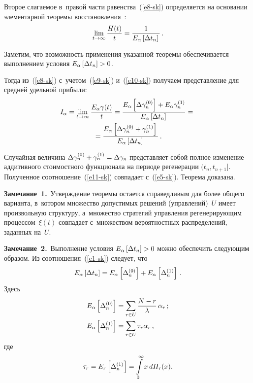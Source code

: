 \begin{multicols}{2}
  Второе слагаемое в~правой час\-ти равенства~(\ref{e8-sk}) определяется на 
основании элементарной тео\-ре\-мы восстановления~\cite{9-sk}:
  \begin{equation}
  \lim\limits_{t\to\infty} \displaystyle\frac{\displaystyle H(t)\mathstrut}{\displaystyle t\mathstrut}=\displaystyle\frac{\displaystyle 1\mathstrut}{\displaystyle E_\alpha\left[ \Delta t_n\right]\mathstrut}\,.
  \label{e10-sk}
  \end{equation}
  
  Заметим, что возможность применения указанной тео\-ре\-мы обеспечивается 
выполнением условия $E_\alpha \left[ \Delta t_n\right] \hm>0$.
  
  Тогда из~(\ref{e8-sk}) с~учетом~(\ref{e9-sk}) и~(\ref{e10-sk}) получаем 
пред\-став\-ле\-ние для сред\-ней удельной прибыли:
  \begin{multline}
  I_\alpha= \lim\limits_{t\to \infty} \displaystyle\frac{\displaystyle E_\alpha \gamma(t)\mathstrut}{\displaystyle t\mathstrut}=\displaystyle\frac{\displaystyle E_\alpha \left[ 
\Delta \gamma_n^{(0)}\right] +E_\alpha \gamma_n^{(1)}\mathstrut}{\displaystyle E_\alpha \left[ \Delta 
t_n\right]\mathstrut}= {}\\
{}=
  \displaystyle\frac{\displaystyle E_\alpha \left[ \Delta\gamma_n^{(0)}+\gamma_n^{(1)}\right]\mathstrut}{\displaystyle E_\alpha \left[ 
\Delta t_n\right]\mathstrut}\,.
  \label{e11-sk}
  \end{multline}
  
  Случайная величина $\Delta\gamma_n^{(0)}\hm+ \gamma_n^{(1)}\hm= 
\Delta\gamma_n$ представляет собой полное изменение аддитивного 
стоимостного функционала на периоде регенерации $(t_n, t_{n+1}]$. 
Полученное соотношение~(\ref{e11-sk}) совпадает с~(\ref{e5-sk}). Тео\-ре\-ма 
доказана.
  
  \smallskip
  
  \noindent
  \textbf{Замечание~1.}\ Утверждение теоремы остается справедливым для 
более общего варианта, в~котором множество допустимых решений 
(управ\-ле\-ний)~$U$ имеет произвольную структуру, а~множество стратегий 
управ\-ле\-ния ре\-ге\-не\-ри\-ру\-ющим процессом~$\xi(t)$ совпадает с~множеством 
вероятностных распределений, заданных на~$U$.
  
  \smallskip
  
  \noindent
  \textbf{Замечание~2.}\ Выполнение условия $E_\alpha\left[ \Delta 
t_n\right]\hm>0$ можно обеспечить сле\-ду\-ющим образом. Из 
соотношения~(\ref{e1-sk}) следует, что 
$$
E_\alpha\left[ \Delta t_n\right]= 
E_\alpha \left[ \Delta_n^{(0)}\right]\hm+ E_\alpha\left[ \Delta_n^{(1)}\right]\,.
$$ 
Здесь
\begin{align*} 
E_\alpha \left[ \Delta_n^{(0)}\right]&= \sum\limits_{r\in U} \displaystyle\frac{\displaystyle N-r\mathstrut}{\displaystyle \lambda\mathstrut}\, 
\alpha_r\,;\\
E_\alpha \left[ \Delta_n^{(1)}\right]&= \sum\limits_{r\in U} \tau_r 
\alpha_r\,,
\end{align*}
где
$$
\tau_r= E_r\left[ \Delta_n^{(1)}\right]\hm= \int\limits_0^\infty 
x\,dH_r(x).
$$
   

\end{multicols}
